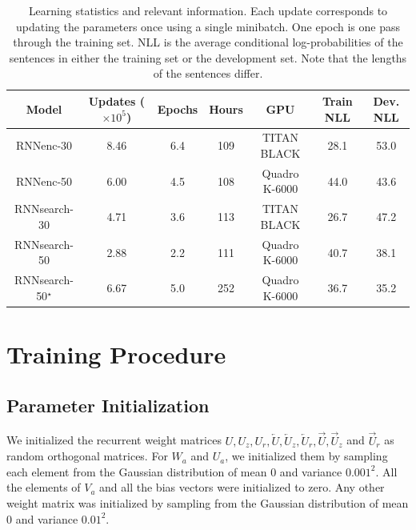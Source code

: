 \documentclass{article}
\newcommand{\ola}{\overleftarrow}
\newcommand{\ora}{\overrightarrow}
\begin{document}
\begin{table}[t]
    \centering                                                                                         
    \begin{tabular}{c|cccccc}                                                                           
        Model & Updates {\scriptsize ($\times 10^5$)} & Epochs 
        & Hours & GPU & Train NLL & Dev. NLL \\
        \hline                                                           
        \hline
        RNNenc-30 & 8.46 & 6.4 & 109 & {\small TITAN BLACK} & 28.1 & 53.0 \\                                                
        RNNenc-50 & 6.00 & 4.5 & 108 & {\small Quadro K-6000} & 44.0 & 43.6 \\
        \hline
        RNNsearch-30 & 4.71 & 3.6 & 113 & {\small TITAN BLACK} & 26.7 & 47.2 \\
        RNNsearch-50 & 2.88 & 2.2 & 111 & {\small Quadro K-6000} & 40.7 & 38.1 \\
        \hline
    RNNsearch-50$^\star$ & 6.67 & 5.0 & 252 & {\small Quadro K-6000} & 36.7 & 35.2 \\
    \end{tabular}                                                                                      
    \caption{Learning statistics and relevant information. Each update
        corresponds to updating the parameters once using a single minibatch. 
        One epoch is one pass through the training set.
        NLL is the average conditional log-probabilities of the
        sentences in either the training set or the development set. Note that
    the lengths of the sentences differ.}
    \label{tbl:stat}                                                                                   
\end{table}                                                                                            

\section{Training Procedure}
\label{sec:training_detail}

\subsection{Parameter Initialization}

We initialized the recurrent weight matrices $U, U_z, U_r, \ola{U}, \ola{U}_z,
\ola{U}_r, \ora{U}, \ora{U}_z$ and $\ora{U}_r$ as random orthogonal matrices.
For $W_a$ and $U_a$, we initialized them by sampling each element from the
Gaussian distribution of mean $0$ and variance $0.001^2$. All the elements of
$V_a$ and all the bias vectors were initialized to zero. Any other weight matrix
was initialized by sampling from the Gaussian distribution of mean $0$ and
variance $0.01^2$.
\end{document}
